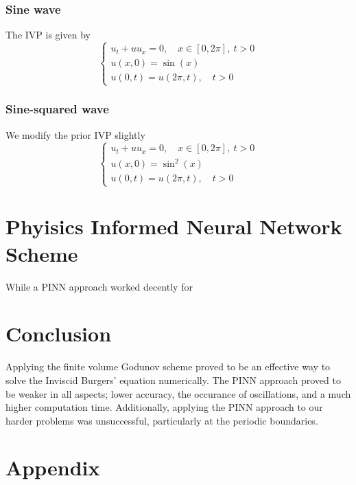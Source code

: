 \documentclass{myproject}
\begin{document}
\subsubsection{Sine wave}

The IVP is given by
\begin{equation}\label{sine_wave}
    \begin{cases}
        u_t + uu_x = 0, \quad x \in [0, 2\pi], \: t>0 \\
        u(x,0) = \sin(x) \\
        u(0,t) = u(2\pi,t), \quad t > 0
    \end{cases}
\end{equation}

\subsubsection{Sine-squared wave}

We modify the prior IVP slightly
\begin{equation}\label{sine-squared_wave}
    \begin{cases}
        u_t + uu_x = 0, \quad x \in [0, 2\pi], \: t>0 \\
        u(x,0) = \sin^2(x) \\
        u(0,t) = u(2\pi,t), \quad t > 0
    \end{cases}
\end{equation}

\section{Phyisics Informed Neural Network Scheme}

While a PINN approach worked decently for 

\section{Conclusion}

Applying the finite volume Godunov scheme proved to be an effective way to solve the Inviscid Burgers' equation numerically. The PINN approach proved to be weaker in all aspects; lower accuracy, the occurance of oscillations, and a much higher computation time. Additionally, applying the PINN approach to our harder problems was unsuccessful, particularly at the periodic boundaries.

\newpage
\appendix
\section{Appendix}
\end{document}
